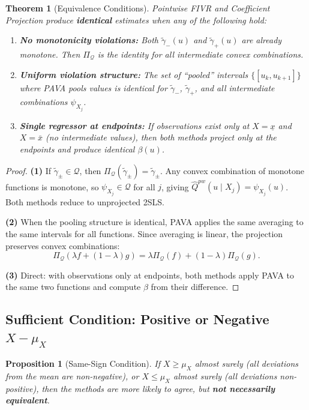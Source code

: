\documentclass[12pt]{article}
\newcommand{\calQ}{\mathcal{Q}}
\newcommand{\PiQ}{\Pi_{\mathcal{Q}}}
\newtheorem{theorem}{Theorem}
\newtheorem{proposition}{Proposition}
\begin{document}
\begin{theorem}[Equivalence Conditions]\label{thm:equiv}
Pointwise FIVR and Coefficient Projection produce \textbf{identical} estimates when any of the following hold:

\begin{enumerate}
\item \textbf{No monotonicity violations:} Both $\tilde{\gamma}_-(u)$ and $\tilde{\gamma}_+(u)$ are already monotone. Then $\PiQ$ is the identity for all intermediate convex combinations.

\item \textbf{Uniform violation structure:} The set of ``pooled'' intervals $\{[u_k, u_{k+1}]\}$ where PAVA pools values is identical for $\tilde{\gamma}_-$, $\tilde{\gamma}_+$, and all intermediate combinations $\psi_{X_j}$.

\item \textbf{Single regressor at endpoints:} If observations exist only at $X = \underline{x}$ and $X = \bar{x}$ (no intermediate values), then both methods project only at the endpoints and produce identical $\beta(u)$.
\end{enumerate}
\end{theorem}

\begin{proof}
\textbf{(1)} If $\tilde{\gamma}_\pm \in \calQ$, then $\PiQ(\tilde{\gamma}_\pm) = \tilde{\gamma}_\pm$. Any convex combination of monotone functions is monotone, so $\psi_{X_j} \in \calQ$ for all $j$, giving $\hat{Q}^{pw}(u \mid X_j) = \psi_{X_j}(u)$. Both methods reduce to unprojected 2SLS.

\textbf{(2)} When the pooling structure is identical, PAVA applies the same averaging to the same intervals for all functions. Since averaging is linear, the projection preserves convex combinations:
\[
\PiQ(\lambda f + (1-\lambda) g) = \lambda \PiQ(f) + (1-\lambda) \PiQ(g).
\]

\textbf{(3)} Direct: with observations only at endpoints, both methods apply PAVA to the same two functions and compute $\beta$ from their difference.
\end{proof}

\subsection{Sufficient Condition: Positive or Negative $X - \mu_X$}

\begin{proposition}[Same-Sign Condition]\label{prop:samesign}
If $X \geq \mu_X$ almost surely (all deviations from the mean are non-negative), or $X \leq \mu_X$ almost surely (all deviations non-positive), then the methods are more likely to agree, but \textbf{not necessarily equivalent}.
\end{proposition}
\end{document}
